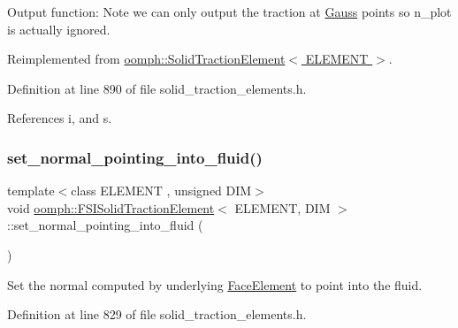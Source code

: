 Output function\+: Note we can only output the traction at \hyperlink{classoomph_1_1Gauss}{Gauss} points so n\+\_\+plot is actually ignored. 



Reimplemented from \hyperlink{classoomph_1_1SolidTractionElement_a13a5bbe49c2d7ad5079e3354a34f248e}{oomph\+::\+Solid\+Traction\+Element$<$ E\+L\+E\+M\+E\+N\+T $>$}.



Definition at line 890 of file solid\+\_\+traction\+\_\+elements.\+h.



References i, and s.

\mbox{\label{classoomph_1_1FSISolidTractionElement_a0addf60f42d1386b6b07f52f62a8373b}} 
\subsubsection{\texorpdfstring{set\+\_\+normal\+\_\+pointing\+\_\+into\+\_\+fluid()}{set\_normal\_pointing\_into\_fluid()}}
{\footnotesize\ttfamily template$<$class E\+L\+E\+M\+E\+NT , unsigned D\+IM$>$ \\
void \hyperlink{classoomph_1_1FSISolidTractionElement}{oomph\+::\+F\+S\+I\+Solid\+Traction\+Element}$<$ E\+L\+E\+M\+E\+NT, D\+IM $>$\+::set\+\_\+normal\+\_\+pointing\+\_\+into\+\_\+fluid (\begin{DoxyParamCaption}{ }\end{DoxyParamCaption})\hspace{0.3cm}{\ttfamily [inline]}}



Set the normal computed by underlying \hyperlink{classoomph_1_1FaceElement}{Face\+Element} to point into the fluid. 



Definition at line 829 of file solid\+\_\+traction\+\_\+elements.\+h.

\mbox{\label{classoomph_1_1FSISolidTractionElement_aaa745c32fe53e76ac0b9d1b00a05fe36}} 
